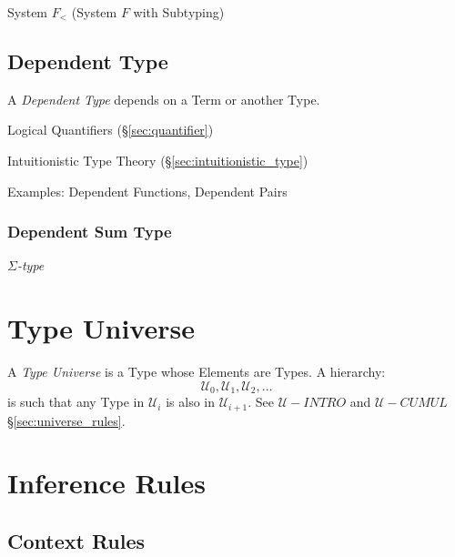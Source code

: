 System $F_<$ (System $F$ with Subtyping)



\subsection{Dependent Type}\label{sec:dependent_type}

A \emph{Dependent Type} depends on a Term or another Type.

Logical Quantifiers (\S\ref{sec:quantifier})

Intuitionistic Type Theory (\S\ref{sec:intuitionistic_type})

Examples: Dependent Functions, Dependent Pairs



\subsubsection{Dependent Sum Type}\label{sec:dependent_sum}

\emph{$\Sigma$-type}



\section{Type Universe}\label{sec:type_universe}

A \emph{Type Universe} is a Type whose Elements are Types. A hierarchy:
\[
  \mathcal{U}_0, \mathcal{U}_1, \mathcal{U}_2, \ldots
\]
is such that any Type in $\mathcal{U}_i$ is also in
$\mathcal{U}_{i+1}$. See $\mathcal{U}-INTRO$ and $\mathcal{U}-CUMUL$
\S\ref{sec:universe_rules}.



\section{Inference Rules}\label{sec:type_inference}

\subsection{Context Rules}


